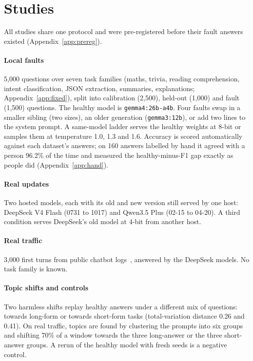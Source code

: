 \documentclass[11pt]{article}
\begin{document}
\section{Studies}
\label{sec:setup}

All studies share one protocol and were pre-registered before their fault answers
existed (Appendix~\ref{app:prereg}).

\paragraph{Local faults} 5{,}000 questions over seven task families (maths,
trivia, reading comprehension, intent classification, JSON extraction, summaries,
explanations; Appendix~\ref{app:fixed}), split into calibration (2{,}500), held-out
(1{,}000) and fault (1{,}500) questions. The healthy model is
\texttt{gemma4:26b-a4b}. Four faults swap in a smaller sibling (two sizes), an
older generation (\texttt{gemma3:12b}), or add two lines to the system prompt. A
same-model ladder serves the healthy weights at 8-bit or samples them at
temperature 1.0, 1.3 and 1.6. Accuracy is scored automatically against each
dataset's answers; on 160 answers labelled by hand it agreed with a person 96.2\%
of the time and measured the healthy-minus-F1 gap exactly as people did
(Appendix~\ref{app:hand}).

\paragraph{Real updates} Two hosted models, each with its old and new version
still served by one host: DeepSeek V4 Flash (0731 to 1017) and
Qwen3.5 Plus (02-15 to 04-20). A third condition serves DeepSeek's old model at
4-bit from another host.

\paragraph{Real traffic} 3{,}000 first turns from public chatbot
logs~\citep{zhao2024wildchat}, answered by the DeepSeek models. No task family is
known.

\paragraph{Topic shifts and controls} Two harmless shifts replay healthy answers
under a different mix of questions: towards long-form or towards short-form tasks
(total-variation distance 0.26 and 0.41). On real traffic, topics are found by
clustering the prompts into six groups and shifting 70\% of a window towards the
three long-answer or the three short-answer groups. A rerun of the healthy model
with fresh seeds is a negative control.
\end{document}
